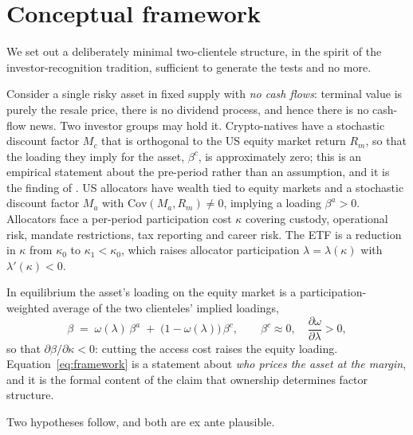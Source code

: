 \documentclass[12pt,a4paper]{article}
\begin{document}
\section{Conceptual framework}\label{sec:framework}

We set out a deliberately minimal two-clientele structure, in the spirit of the investor-recognition tradition, sufficient to generate the tests and no more.

Consider a single risky asset in fixed supply with \emph{no cash flows}: terminal value is purely the resale price, there is no dividend process, and hence there is no cash-flow news. Two investor groups may hold it. Crypto-natives have a stochastic discount factor $M_c$ that is orthogonal to the US equity market return $R_m$, so that the loading they imply for the asset, $\beta^{c}$, is approximately zero; this is an empirical statement about the pre-period rather than an assumption, and it is the finding of \citet{liu2020risks}. US allocators have wealth tied to equity markets and a stochastic discount factor $M_a$ with $\mathrm{Cov}(M_a, R_m) \neq 0$, implying a loading $\beta^{a} > 0$. Allocators face a per-period participation cost $\kappa$ covering custody, operational risk, mandate restrictions, tax reporting and career risk. The ETF is a reduction in $\kappa$ from $\kappa_0$ to $\kappa_1 < \kappa_0$, which raises allocator participation $\lambda = \lambda(\kappa)$ with $\lambda'(\kappa) < 0$.

In equilibrium the asset's loading on the equity market is a participation-weighted average of the two clienteles' implied loadings,
\begin{equation}
\beta \;=\; \omega(\lambda)\,\beta^{a} \;+\; \bigl(1-\omega(\lambda)\bigr)\,\beta^{c},
\qquad \beta^{c} \approx 0, \quad \frac{\partial \omega}{\partial \lambda} > 0,
\label{eq:framework}
\end{equation}
so that $\partial \beta / \partial \kappa < 0$: cutting the access cost raises the equity loading. Equation~\eqref{eq:framework} is a statement about \emph{who prices the asset at the margin}, and it is the formal content of the claim that ownership determines factor structure.

Two hypotheses follow, and both are ex ante plausible.
\end{document}
